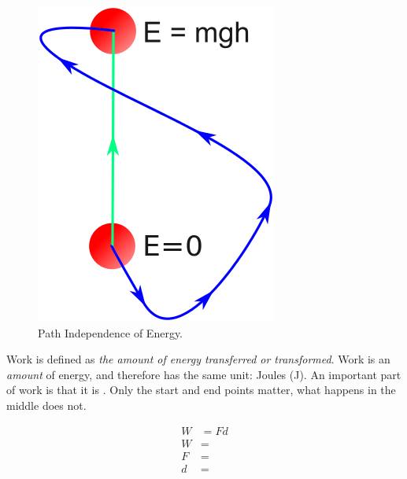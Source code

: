 \documentclass{report}
\begin{document}
\begin{figure}
    \vspace{-1cm}
    \begin{center}
    	\includegraphics[width=0.9\linewidth]{work-path-independence.png}
        \caption{Path Independence of Energy.}
        \label{default}
    \end{center}
\end{figure}

Work is defined as \textit{the amount of energy transferred or transformed}. Work is an \textit{amount} of energy, and therefore has the same unit: Joules (J). An important part of work is that it is . Only the start and end points matter, what happens in the middle does not.

\begin{align*}
	W &= Fd \\
	W &= \\
	F &= \\
	d &=
\end{align*}
\end{document}
